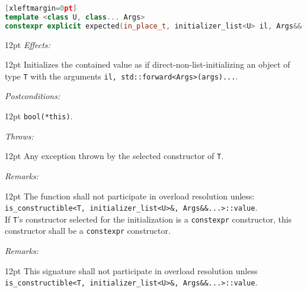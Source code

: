 \documentclass[a4paper,10pt]{article}
\newcommand{\cpp}[1]{\lstinline{#1}}
\newcommand{\wordingItem}[1]{\noindent\textit{#1:}}
\newenvironment{wordingTextItem}[1]{\wordingItem{#1}\vspace{2pt}\noindent\begin{adjustwidth}{12pt}{}}{\vspace{2pt}\end{adjustwidth}}
\newenvironment{wordingPara}{\begin{adjustwidth}{12pt}{}}{\end{adjustwidth}}
\begin{document}
\begin{lstlisting}[language=C++][xleftmargin=0pt]
template <class U, class... Args>
constexpr explicit expected(in_place_t, initializer_list<U> il, Args&&... args); 
\end{lstlisting}
\begin{wordingPara}
\begin{wordingTextItem}{Effects}
Initializes the contained value as if direct-non-list-initializing an object of type \cpp{T} with the arguments \cpp{il, std::forward<Args>(args)...}.
\end{wordingTextItem}
\begin{wordingTextItem}{Postconditions}
\cpp{bool(*this)}.
\end{wordingTextItem}
\begin{wordingTextItem}{Throws}
Any exception thrown by the selected constructor of \cpp{T}.
\end{wordingTextItem}
\begin{wordingTextItem}{Remarks}
The function shall not participate in overload resolution unless:\\
\noindent
\cpp{is_constructible<T, initializer_list<U>&, Args&&...>::value}.\\

\noindent
If \cpp{T}'s constructor selected for the initialization is a \cpp{constexpr} constructor, this constructor shall be a \cpp{constexpr} constructor.
\end{wordingTextItem}
\begin{wordingTextItem}{Remarks}
This signature shall not participate in overload resolution unless\\
\cpp{is_constructible<T, initializer_list<U>&, Args&&...>::value}.
\end{wordingTextItem}
\end{wordingPara}
\end{document}
